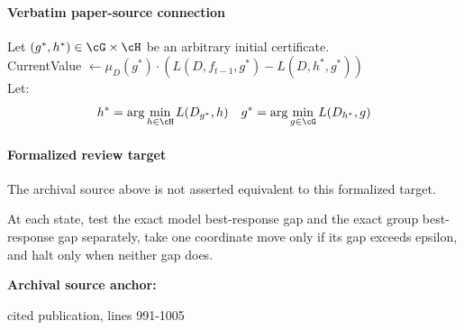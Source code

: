 \documentclass[10pt]{article}
\begin{document}
\paragraph{Verbatim paper-source connection}
\begin{ReviewVerbatim}
\begin{algorithm}
Let $(g^*,h^*) \in \cG \times \cH$ be an arbitrary initial certificate.  \\
CurrentValue $\leftarrow \mu_{D}(g^*)\cdot (L(D,f_{t-1},g^*) - L(D,h^*,g^*))$ \\
Let:
$$h^* = \arg\min_{h \in \cH} L(D_{g^*},h) \ \ \ g^* = \arg\min_{g \in \cG} L(D_{h^*},g)$$
\caption{AltMinCertificateFinder($D,f_{t-1},\cG,\cH,\epsilon)$: An algorithm for finding $\epsilon$-locally optimal certificates of sub-optimality $(g_t,h_t) \in \cG\times \cH$ for model $f_{t-1}$.}
\label{alg:altmin}
\end{algorithm}
\end{ReviewVerbatim}


\paragraph{Formalized review target}
The archival source above is not asserted equivalent to this formalized target.
\begin{ReviewVerbatim}
At each state, test the exact model best-response gap and the exact group best-response gap separately, take one coordinate move only if its gap exceeds epsilon, and halt only when neither gap does.
\end{ReviewVerbatim}

\textbf{Archival source anchor:} {\footnotesize\raggedright cited publication, lines 991-\allowbreak{}1005\par}
\end{document}
